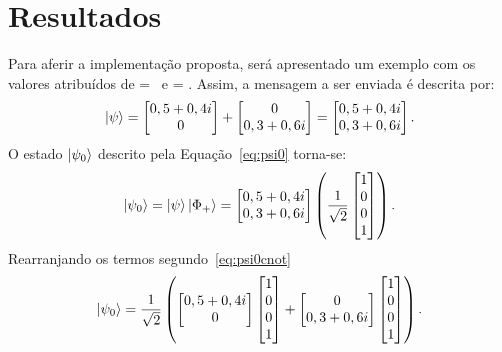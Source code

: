 \chapter{Resultados}

Para aferir a implementação proposta, será apresentado um exemplo com os valores atribuídos de \alpha = \norma\ e \beta = \normb.  Assim, a mensagem a ser enviada é descrita por:
\begin{equation}
  \ket{\psi} =  \begin{bmatrix} {0,5+0,4i} \\ 0 \end{bmatrix} +
  \begin{bmatrix} 0 \\ {0,3+0,6i} \end{bmatrix} =
  \begin{bmatrix} {0,5+0,4i} \\ {0,3+0,6i} \end{bmatrix}.
\end{equation}
O estado $\ket{\psi_0}$ descrito pela Equação~\eqref{eq:psi0} torna-se:
\begin{equation}
  \ket{\psi_0} = \ket{\psi}\ket{\Phi_+} =
  \begin{bmatrix} {0,5+0,4i} \\ {0,3+0,6i} \end{bmatrix}
  \left(\frac{1}{\sqrt{2}} \begin{bmatrix} 1 \\ 0 \\ 0 \\ 1 \end{bmatrix}\right).
\end{equation}
Rearranjando os termos segundo~\eqref{eq:psi0cnot}
\begin{equation}
  \ket{\psi_0} = \frac{1}{\sqrt{2}}\left(
      \begin{bmatrix} {0,5+0,4i} \\ 0 \end{bmatrix}
      \begin{bmatrix} 1 \\ 0 \\ 0 \\ 1 \end{bmatrix} +
      \begin{bmatrix} 0 \\ {0,3+0,6i} \end{bmatrix}
      \begin{bmatrix} 1 \\ 0 \\ 0 \\ 1 \end{bmatrix}\right).
  \end{equation}


